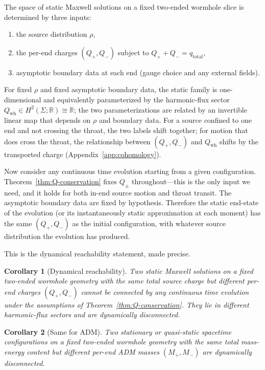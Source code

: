 \documentclass[aps,prd,onecolumn,nofootinbib,superscriptaddress]{revtex4-2}
\newtheorem{corollary}{Corollary}
\begin{document}
The space of static Maxwell solutions on a fixed two-ended wormhole slice is determined by three inputs:
\begin{enumerate}
    \item the source distribution $\rho$,
    \item the per-end charges $(Q_+,Q_-)$ subject to $Q_+ + Q_- = q_{\mathrm{total}}$,
    \item asymptotic boundary data at each end (gauge choice and any external fields).
\end{enumerate}
For fixed $\rho$ and fixed asymptotic boundary data, the static family is one-dimensional and equivalently parameterized by the harmonic-flux sector $Q_{\mathrm{wh}} \in H^2(\Sigma;\mathbb{R}) \cong \mathbb{R}$; the two parameterizations are related by an invertible linear map that depends on $\rho$ and boundary data. For a source confined to one end and not crossing the throat, the two labels shift together; for motion that does cross the throat, the relationship between $(Q_+,Q_-)$ and $Q_{\mathrm{wh}}$ shifts by the transported charge (Appendix~\ref{app:cohomology}).

Now consider any continuous time evolution starting from a given configuration. Theorem~\ref{thm:Q-conservation} fixes $Q_\pm$ throughout---this is the only input we need, and it holds for both in-end source motion and throat transit. The asymptotic boundary data are fixed by hypothesis. Therefore the static end-state of the evolution (or its instantaneously static approximation at each moment) has the same $(Q_+,Q_-)$ as the initial configuration, with whatever source distribution the evolution has produced.

This is the dynamical reachability statement, made precise.

\begin{corollary}[Dynamical reachability]
\label{cor:reachability}
Two static Maxwell solutions on a fixed two-ended wormhole geometry with the same total source charge but different per-end charges $(Q_+,Q_-)$ cannot be connected by any continuous time evolution under the assumptions of Theorem~\ref{thm:Q-conservation}. They lie in different harmonic-flux sectors and are dynamically disconnected.
\end{corollary}

\begin{corollary}[Same for ADM]
\label{cor:reachability-adm}
Two stationary or quasi-static spacetime configurations on a fixed two-ended wormhole geometry with the same total mass-energy content but different per-end ADM masses $(M_+,M_-)$ are dynamically disconnected.
\end{corollary}
\end{document}
